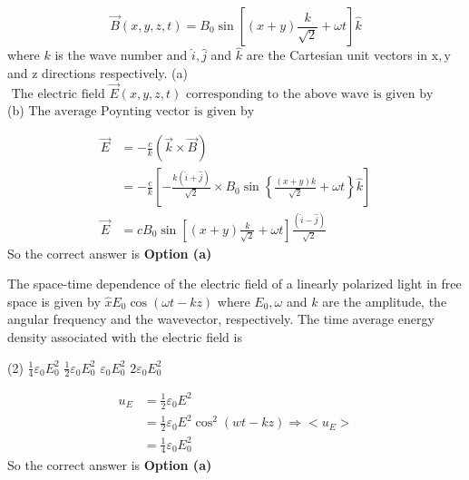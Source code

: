 \begin{enumerate}
\begin{minipage}{\textwidth}
		$$
		\vec{B}(x, y, z, t)=B_{0} \sin \left[(x+y) \frac{k}{\sqrt{2}}+\omega t\right] \hat{k}
		$$
		where $k$ is the wave number and $\hat{i}, \hat{j}$ and $\hat{k}$ are the Cartesian unit vectors in $\mathrm{x}, \mathrm{y}$ and $\mathrm{z}$ directions respectively.
		(a)$\text { The electric field } \vec{E}(x, y, z, t) \text { corresponding to the above wave is given by }$\\
		(b)$\text { The average Poynting vector is given by }$
	\end{minipage}
\begin{answer}
	\begin{align*}
	\vec{E}&=-\frac{c}{k}(\vec{k} \times \vec{B})\\&=-\frac{c}{k}\left[-\frac{k(\hat{i}+\hat{j})}{\sqrt{2}} \times B_{0} \sin \left\{\frac{(x+y) k}{\sqrt{2}}+\omega t\right\} \hat{k}\right]\\
	\vec{E}&=c B_{0} \sin \left[(x+y) \frac{k}{\sqrt{2}}+\omega t\right] \frac{(\hat{i}-\hat{j})}{\sqrt{2}}
	\end{align*}
	So the correct answer is \textbf{Option (a)}
\end{answer}
	\begin{minipage}{\textwidth}
		\item The space-time dependence of the electric field of a linearly polarized light in free space is given by $\hat{x} E_{0} \cos (\omega t-k z)$ where $E_{0}, \omega$ and $k$ are the amplitude, the angular frequency and the wavevector, respectively. The time average energy density associated with the electric field is
	\end{minipage}
	\begin{tasks}(2)
		\task[\textbf{a.}] $\frac{1}{4} \varepsilon_{0} E_{0}^{2}$
		\task[\textbf{b.}]$\frac{1}{2} \varepsilon_{0} E_{0}^{2}$
		\task[\textbf{c.}]$\varepsilon_{0} E_{0}^{2}$
		\task[\textbf{d.}]$2 \varepsilon_{0} E_{0}^{2}$
	\end{tasks}
\begin{answer}
	\begin{align*}
	u_{E}&=\frac{1}{2} \varepsilon_{0} E^{2}\\&=\frac{1}{2} \varepsilon_{0} E^{2} \cos ^{2}(w t-k z) \Rightarrow<u_{E}>\\&=\frac{1}{4} \varepsilon_{0} E_{0}^{2}
	\end{align*}
	So the correct answer is \textbf{Option (a)}
\end{answer}
	\begin{minipage}{\textwidth}

\end{minipage}
\end{enumerate}
